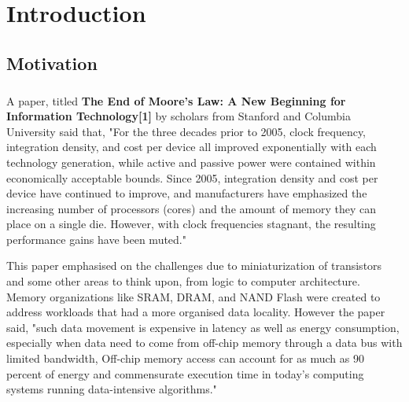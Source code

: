 %
%
\let\textcircled=\pgftextcircled
\chapter{Introduction}
\label{chap:intro}
\vspace{-0.2 cm}

\section{Motivation}

\paragraph{}

A paper, titled \textbf{The End of Moore's Law: A New Beginning for Information Technology[1]} by scholars from Stanford and Columbia University said that, "For the three decades prior to 2005, clock frequency, integration density, and cost per device all improved exponentially with each technology generation, while active and passive power were contained within economically acceptable bounds. Since 2005, integration density and cost per device have continued to improve, and manufacturers have emphasized the increasing number of processors (cores) and the amount of memory they can place on a single die. However, with clock frequencies stagnant, the resulting performance gains have been muted."

This paper emphasised on the challenges due to miniaturization of transistors and some other areas to think upon, from logic to computer architecture. Memory organizations like SRAM, DRAM, and NAND Flash were created to address workloads that had a more organised data locality. However the paper said, "such data movement is expensive in latency as well as energy consumption, especially when data need to come from off-chip memory through a data bus with limited bandwidth, Off-chip memory access can account for as much as 90 percent of energy and commensurate execution time in today’s computing systems running data-intensive algorithms."

